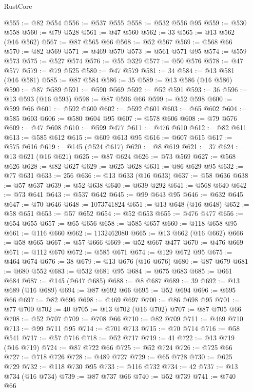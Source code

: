 \begin{lexlean}{RustCore}
\begin{coremodule}
@555 := @82 @554
@556 := @537 @555
@558 := @532 @556 @95
@559 := @530 @558
@560 := @79 @528
@561 := @47 @560
@562 := 33
@565 := @13 @562 (@16 @562)
@567 := @87 @565 @66
@568 := @52 @567
@569 := @568 @66
@570 := @82 @569
@571 := @469 @570
@573 := @561 @571 @95
@574 := @559 @573
@575 := @527 @574
@576 := @55 @329
@577 := @50 @576
@578 := @47 @577
@579 := @79 @525
@580 := @47 @579
@581 := 34
@584 := @13 @581 (@16 @581)
@585 := @87 @584
@586 := 35
@589 := @13 @586 (@16 @586)
@590 := @87 @589
@591 := @590 @569
@592 := @52 @591
@593 := 36
@596 := @13 @593 (@16 @593)
@598 := @87 @596 @66
@599 := @52 @598
@600 := @599 @66
@601 := @592 @600
@602 := @592 @601
@603 := @65 @602
@604 := @585 @603
@606 := @580 @604 @95
@607 := @578 @606
@608 := @79 @576
@609 := @47 @608
@610 := @599 @477
@611 := @476 @610
@612 := @82 @611
@613 := @585 @612
@615 := @609 @613 @95
@616 := @607 @615
@617 := @575 @616
@619 := @145 (@524 @617)
@620 := @8 @619
@621 := 37
@624 := @13 @621 (@16 @621)
@625 := @87 @624
@626 := @73 @569
@627 := @568 @626
@628 := @82 @627
@629 := @625 @628
@631 := @86 @629 @95
@632 := @77 @631
@633 := 256
@636 := @13 @633 (@16 @633)
@637 := @58 @636
@638 := @57 @637
@639 := @52 @638
@640 := @639 @292
@641 := @568 @640
@642 := @73 @641
@643 := @537 @642
@645 := @99 @643 @95
@646 := @632 @645
@647 := @70 @646
@648 := 1073741824
@651 := @13 @648 (@16 @648)
@652 := @58 @651
@653 := @57 @652
@654 := @52 @653
@655 := @476 @477
@656 := @654 @655
@657 := @65 @656
@658 := @585 @657
@660 := @118 @658 @95
@661 := @116 @660
@662 := 1132462080
@665 := @13 @662 (@16 @662)
@666 := @58 @665
@667 := @57 @666
@669 := @52 @667 @477
@670 := @476 @669
@671 := @112 @670
@672 := @585 @671
@674 := @129 @672 @95
@675 := @464 @674
@676 := 38
@679 := @13 @676 (@16 @676)
@680 := @87 @679
@681 := @680 @552
@683 := @532 @681 @95
@684 := @675 @683
@685 := @661 @684
@687 := @145 (@647 @685)
@688 := @8 @687
@689 := 39
@692 := @13 @689 (@16 @689)
@694 := @87 @692 @66
@695 := @52 @694
@696 := @695 @66
@697 := @82 @696
@698 := @469 @697
@700 := @86 @698 @95
@701 := @77 @700
@702 := 40
@705 := @13 @702 (@16 @702)
@707 := @87 @705 @66
@708 := @52 @707
@709 := @708 @66
@710 := @82 @709
@711 := @469 @710
@713 := @99 @711 @95
@714 := @701 @713
@715 := @70 @714
@716 := @58 @541
@717 := @57 @716
@718 := @52 @717
@719 := 41
@722 := @13 @719 (@16 @719)
@724 := @87 @722 @66
@725 := @52 @724
@726 := @725 @66
@727 := @718 @726
@728 := @489 @727
@729 := @65 @728
@730 := @625 @729
@732 := @118 @730 @95
@733 := @116 @732
@734 := 42
@737 := @13 @734 (@16 @734)
@739 := @87 @737 @66
@740 := @52 @739
@741 := @740 @66

\end{coremodule}
\end{lexlean}
